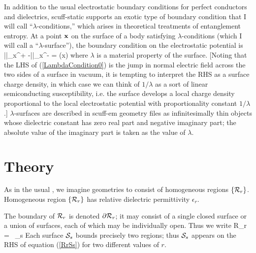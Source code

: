 \documentclass[letterpaper]{article}
\begin{document}
In addition to the usual electrostatic boundary conditions
for perfect conductors and dielectrics, {\sc scuff-static} 
supports an exotic type of boundary condition that I will 
call ``$\lambda$-conditions,'' which arises in theoretical
treatments of entanglement entropy. At a point $\mathbf{x}$ on
the surface of a body 
satisfying $\lambda$-conditions (which I will call a 
``$\lambda$-surface''), the boundary condition on the
electrostatic potential is 
{
    \left|\right|_{\vb x^+} 
   -\left|\right|_{\vb x^-} 
   = \phi(\vb x)
}
where $\lambda$ is a material property of the surface.
[Noting that the LHS of (\ref{LambdaCondition0}) is the
jump in normal electric field across the two sides of
a surface in vacuum, it is 
tempting to interpret the RHS as a surface charge
density, in which case we can think of $1/\lambda$ as 
a sort of linear semiconducting susceptibility, i.e.
the surface develops a local charge density proportional to 
the local electrostatic potential with proportionality
constant $1/\lambda$.] $\lambda$-surfaces are 
described in {\sc scuff-em} geometry files as 
infinitesimally thin objects whose dielectric 
constant has zero real part and negative imaginary part;
the absolute value of the imaginary part is taken
as the value of $\lambda.$

\newpage
\section{Theory}

As in the usual \ls, we imagine geometries to consist
of homogeneous regions $\{\mathcal{R}_r\}$. Homogeneous region 
$\{\mathcal{R}_r\}$ has relative dielectric permittivity 
$\epsilon_r.$ 

The boundary of $\mathcal{R}_r$ is denoted $\partial \mathcal{R}_r$; 
it may consist of a single closed surface or a union of
surfaces, each of which may be individually open.
Thus we write 
 { \partial \mc R_r = \cup \, _s }
Each surface $\mathcal{S}_s$ bounds precisely two regions; 
thus $\mathcal{S}_s$ appears on the RHS of equation (\ref{RrSs})
for two different values of $r$. 
\end{document}
